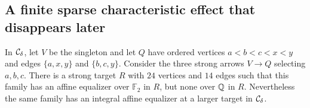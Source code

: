 \subsection{A finite sparse characteristic effect that disappears later}

\begin{proposition}
\label{C4:sparse-local-global}
In $\mathcal C_\delta$, let $V$ be the singleton and let $Q$ have
ordered vertices $a<b<c<x<y$ and edges $\{a,x,y\}$ and
$\{b,c,y\}$. Consider the three strong arrows $V\to Q$
selecting $a,b,c$. There is a strong target $R$ with
$24$ vertices and $14$ edges such that this family has an
affine equalizer over $\mathbb F_2$ in $R$, but none over
$\mathbb Q$ in $R$. Nevertheless the same family has an integral
affine equalizer at a larger target in $\mathcal C_\delta$.
\end{proposition}
